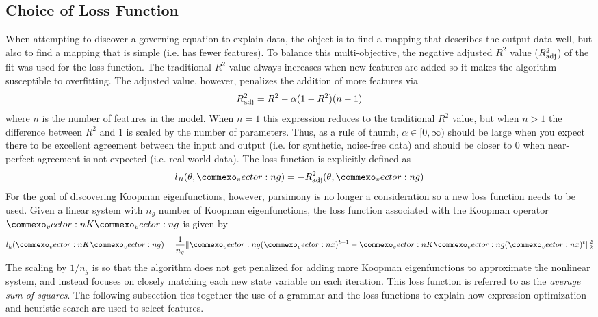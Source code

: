 \documentclass{article}
\renewcommand{\vec}[1]{\vect{#1}}
\newcommand{\mat}[1]{\vect{#1}}
\begin{document}
\subsection{Choice of Loss Function}
\label{lossfunction}
When attempting to discover a governing equation to explain data, the object is to find a mapping that describes the output data well, but also to find a mapping that is simple (i.e. has fewer features). To balance this multi-objective, the negative adjusted $R^2$ value ($R_{\rm adj}^2$) of the fit was used for the loss function. The traditional $R^2$ value always increases when new features are added so it makes the algorithm susceptible to overfitting. The adjusted value, however, penalizes the addition of more features via
\begin{equation} 
R_{\rm adj}^2 = R^2 - \alpha (1-  R^2)(n-1)
\end{equation}
where $n$ is the number of features in the model. When $n=1$ this expression reduces to the traditional $R^2$ value, but when $n>1$ the difference between $R^2$ and 1 is scaled by the number of parameters. Thus, as a rule of thumb, $\alpha \in [0, \infty)$ should be large when you expect there to be excellent agreement between the input and output (i.e. for synthetic, noise-free data) and should be closer to 0 when near-perfect agreement is not expected (i.e. real world data). The loss function is explicitly defined as 
\begin{equation}
    l_R(\theta, \vec{g}) = - R_{\rm adj}^2(\theta, \vec{g})
\end{equation}
For the goal of discovering Koopman eigenfunctions, however, parsimony is no longer a consideration so a new loss function needs to be used. Given a linear system with $n_g$ number of Koopman eigenfunctions, the loss function associated with the Koopman operator $\mat{K} \vec{g}$ is given by
\begin{equation} l_k(\mat{K} \vec{g}) = \frac{1}{n_g}\lVert \vec{g}(\vec{x})^{t+1} - \mat{K} \vec{g}(\vec{x})^{t}\rVert _2^2 \end{equation}
The scaling by $1/n_g$ is so that the algorithm does not get penalized for adding more Koopman eigenfunctions to approximate the nonlinear system, and instead focuses on closely matching each new state variable on each iteration. This loss function is referred to as the \emph{average sum of squares}. The following subsection ties together the use of a grammar and the loss functions to explain how expression optimization and heuristic search are used to select features.
\end{document}
